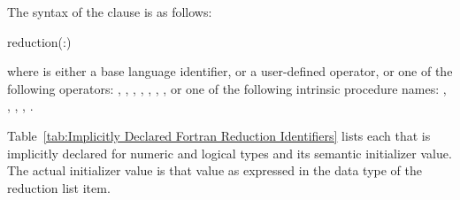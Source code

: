 \fortranspecificstart
The syntax of the  clause is as follows:

\begin{boxedcode}
reduction(:)
\end{boxedcode}

where  is either a base language identifier, or a user-defined operator, 
or one of the following operators: 
\code{+}, 
\code{-}, 
\code{*}, 
, 
, 
, 
, 
 or one of the following intrinsic procedure names: 
, 
, 
, 
, 
. 

Table~\ref{tab:Implicitly Declared Fortran Reduction Identifiers} lists each  that is implicitly declared for numeric 
and logical types and its semantic initializer value. The actual initializer value is that 
value as expressed in the data type of the reduction list item.

